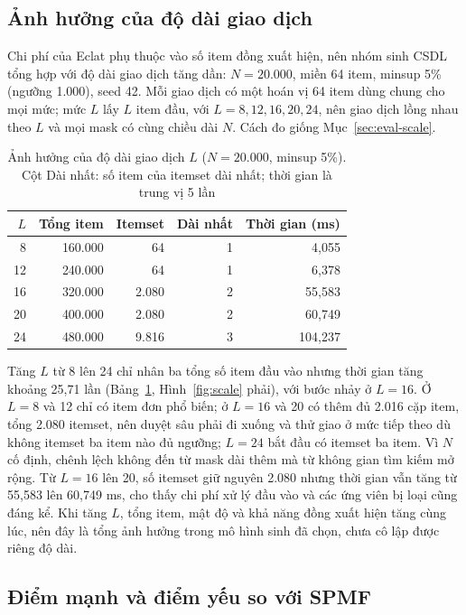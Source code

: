 \subsection{Ảnh hưởng của độ dài giao dịch}
\label{sec:eval-length}

Chi phí của Eclat phụ thuộc vào số item đồng xuất hiện, nên nhóm sinh CSDL tổng hợp với độ dài giao dịch tăng dần:
$N = 20.000$, miền 64 item, minsup 5\% (ngưỡng 1.000), seed 42. Mỗi giao dịch có một hoán vị 64 item dùng chung
cho mọi mức; mức $L$ lấy $L$ item đầu, với $L = 8, 12, 16, 20, 24$, nên giao dịch lồng nhau theo $L$ và mọi mask có cùng chiều
dài $N$. Cách đo giống Mục~\ref{sec:eval-scale}.

\begin{table}[t]
\caption{Ảnh hưởng của độ dài giao dịch $L$ ($N = 20.000$, minsup 5\%). Cột Dài nhất: số item của itemset dài
nhất; thời gian là trung vị 5 lần}
\label{tab:length}
\centering
\footnotesize
\setlength{\tabcolsep}{4pt}
\begin{tabular}{@{}rrrrr@{}}
\toprule
$L$ & Tổng item & Itemset & Dài nhất & Thời gian (ms) \\
\midrule
8 & 160.000 & 64 & 1 & 4,055 \\
12 & 240.000 & 64 & 1 & 6,378 \\
16 & 320.000 & 2.080 & 2 & 55,583 \\
20 & 400.000 & 2.080 & 2 & 60,749 \\
24 & 480.000 & 9.816 & 3 & 104,237 \\
\bottomrule
\end{tabular}
\end{table}

Tăng $L$ từ 8 lên 24 chỉ nhân ba tổng số item đầu vào nhưng thời gian tăng khoảng 25,71 lần
(Bảng~\ref{tab:length}, Hình~\ref{fig:scale} phải), với bước nhảy ở $L = 16$. Ở $L = 8$ và 12 chỉ có item đơn
phổ biến; ở $L = 16$ và 20 có thêm đủ 2.016 cặp item, tổng 2.080 itemset, nên duyệt sâu phải đi xuống và thử
giao ở mức tiếp theo dù không itemset ba item nào đủ ngưỡng; $L = 24$ bắt đầu có itemset ba item. Vì $N$ cố
định, chênh lệch không đến từ mask dài thêm mà từ không gian tìm kiếm mở rộng. Từ $L = 16$ lên 20, số itemset
giữ nguyên 2.080 nhưng thời gian vẫn tăng từ 55,583 lên 60,749 ms, cho thấy chi phí xử lý đầu vào và các ứng viên
bị loại cũng đáng kể. Khi tăng $L$, tổng item, mật độ và khả năng đồng xuất hiện tăng cùng lúc, nên đây là tổng
ảnh hưởng trong mô hình sinh đã chọn, chưa cô lập được riêng độ dài.

\subsection{Điểm mạnh và điểm yếu so với SPMF}
\label{sec:eval-compare}

